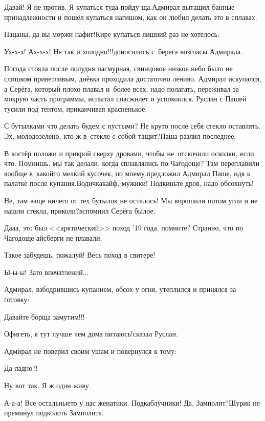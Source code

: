 \diagdash Давай! Я не против. Я купаться туда пойду ща.\mdash Адмирал вытащил банные принадлежности и пошёл купаться нагишом, как он любил делать это в сплавах.

\diagdash Пацаны, да вы моржи нафиг!\mdash Кире купаться лишний раз не хотелось. 

\diagdash Ух-х-х! Ах-х-х! Не так и холодно!!!\mdash доносились с~берега возгласы Адмирала.

Погода стояла после полудня пасмурная, свинцовое низкое небо было не слишком приветливым, днёвка проходила достаточно лениво. Адмирал искупался, а Серёга, который плохо плавал и~более всех, надо полагать, переживал за мокрую часть программы, испытал спасжилет и успокоился. Руслан с Пашей тусили под тентом, приканчивая красненькое:

\diagdash С бутылками что делать будем с пустыми? Не круто после себя стекло оставлять. Эх, молодо\sdash зелено, кто ж в~стекле с собой тащит?\mdash Паша разлил последнее.

\diagdash В костёр положи и прикрой сверху дровами, чтобы не~отскочили осколки, если что. Помнишь, мы так делали, когда сплавлялись по Чагодоще? Там переплавили вообще в~какой\sdash то мелкий кусочек, по моему.\mdash предложил Адмирал Паше, идя к палатке после купания.\mdash Водичка\mdash кайф, мужики! Подкиньте дров, надо обсохнуть!

\diagdash Не, там ваще ничего от тех бутылок не осталось! Мы ворошили потом угли и не нашли стекла, приколи?\mdash вспомнил Серёга былое.

\diagdash Да\sdash а\sdash а, это был <<арктический>> поход '19 года, помните? Странно, что по Чагодоще айсберги не плавали.

\diagdash Такое забудешь, пожалуй! Весь поход в свитере!

\diagdash Ы-ы-ы! Зато впечатлений$\ldots$

Адмирал, взбодрившись купанием, обсох у огня, утеплился и принялся за готовку:

\diagdash Давайте борща замутим!!!

\diagdash Офигеть, я тут лучше чем дома питаюсь!\mdash сказал Руслан.

Адмирал не поверил своим ушам и повернулся к тому:

\diagdash Да ладно?!

\diagdash Ну вот так. Я ж один живу.

\diagdash А-а-а! Все остальные\sdash то у нас женатики. Подкаблучники! Да, Замполит?\mdash Шурик не преминул подколоть Замполита.

